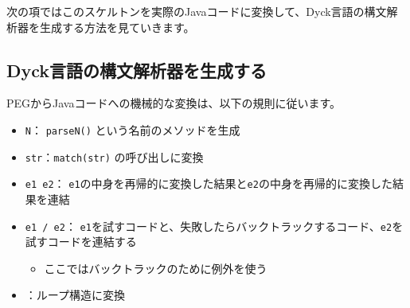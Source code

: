 次の項ではこのスケルトンを実際のJavaコードに変換して、Dyck言語の構文解析器を生成する方法を見ていきます。

\subsection{Dyck言語の構文解析器を生成する}

PEGからJavaコードへの機械的な変換は、以下の規則に従います。

\begin{itemize}
\item
  \texttt{N}： \texttt{parseN()}
  という名前のメソッドを生成
\item
  \texttt{str}：\texttt{match(str)}
  の呼び出しに変換
\item
   \texttt{e1\ e2}：
  \texttt{e1}の中身を再帰的に変換した結果と\texttt{e2}の中身を再帰的に変換した結果を連結
\item
   \texttt{e1\ /\ e2}：
  \texttt{e1}を試すコードと、失敗したらバックトラックするコード、\texttt{e2}を試すコードを連結する

  \begin{itemize}
  \item
    ここではバックトラックのために例外を使う
  \end{itemize}
\item
  ：ループ構造に変換
\end{itemize}

